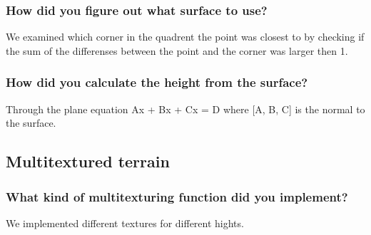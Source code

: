 \documentclass[a4paper,12pt]{article}
\begin{document}
\subsubsection{How did you figure out what surface to use? }
We examined which corner in the quadrent the point was closest to by checking if the sum of the differenses between the point and the corner was larger then 1. 

\subsubsection{How did you calculate the height from the surface?}
Through the plane equation Ax + Bx + Cx = D where [A, B, C] is the normal to the surface. 

\subsection{Multitextured terrain}

\subsubsection{What kind of multitexturing function did you implement? }
We implemented different textures for different hights. 
\end{document}

